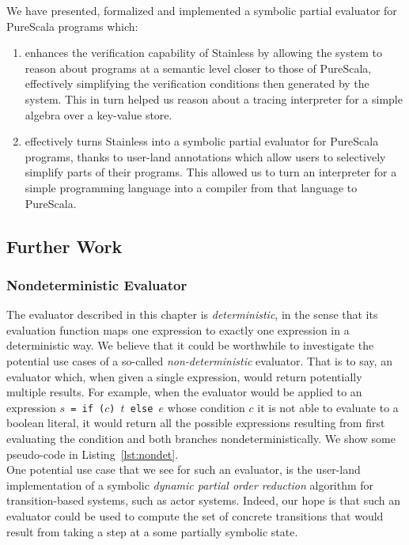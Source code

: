 \documentclass[a4paper,twoside]{article}
\newcommand{\RefCode}[1]{Listing~\ref{#1}}
\newcommand{\stt}[1]{\texttt{\small{#1}}}
\begin{document}
We have presented, formalized and implemented a symbolic partial evaluator for PureScala programs which:

\begin{enumerate}
\item enhances the verification capability of Stainless by allowing the system to reason about programs at a semantic level closer to those of PureScala, effectively simplifying the verification conditions then generated by the system. This in turn helped us reason about a tracing interpreter for a simple algebra over a key-value store.
\item effectively turns Stainless into a symbolic partial evaluator for PureScala programs, thanks to user-land annotations which allow users to selectively simplify parts of their programs. This allowed us to turn an interpreter for a simple programming language into a compiler from that language to PureScala.
\end{enumerate}

\subsection{Further Work}
\label{sym-further}

\subsubsection*{Nondeterministic Evaluator}

The evaluator described in this chapter is \textit{deterministic}, in the sense that its evaluation function maps one expression to exactly one expression in a deterministic way. We believe that it could be worthwhile to investigate the potential use cases of a so-called \textit{non-deterministic} evaluator. That is to say, an evaluator which, when given a single expression, would return potentially multiple results. For example, when the evaluator would be applied to an expression \stt{$s$ = if ($c$) $t$ else $e$} whose condition $c$ it is not able to evaluate to a boolean literal, it would return all the possible expressions resulting from first evaluating the condition and both branches nondeterministically. We show some pseudo-code in \RefCode{lst:nondet}.\\

One potential use case that we see for such an evaluator, is the user-land implementation of a symbolic \textit{dynamic partial order reduction} algorithm for transition-based systems, such as actor systems. Indeed, our hope is that such an evaluator could be used to compute the set of concrete transitions that would result from taking a step at a some partially symbolic state.
\end{document}
